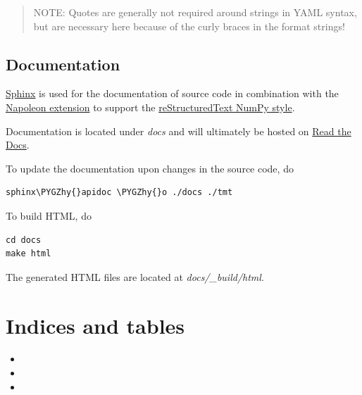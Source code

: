 \documentclass[letterpaper,10pt,english]{sphinxmanual}
\def\PYGZhy{\char`\-}
\begin{document}
\begin{quote}

NOTE: Quotes are generally not required around strings in YAML syntax, but are necessary here because of the curly braces in the format strings!
\end{quote}


\section{Documentation}
\label{intro:documentation}\label{intro:id3}
\href{http://sphinx-doc.org/index.html}{Sphinx} is used for the documentation of source code in combination with the \href{https://pypi.python.org/pypi/sphinxcontrib-napoleon}{Napoleon extension} to support the \href{https://github.com/numpy/numpy/blob/master/doc/HOWTO\_DOCUMENT.rst.txt\#docstring-standard}{reStructuredText NumPy style}.

Documentation is located under \emph{docs} and will ultimately be hosted on \href{https://readthedocs.org/}{Read the Docs}.

To update the documentation upon changes in the source code, do

\begin{Verbatim}[commandchars=\\\{\}]
sphinx\PYGZhy{}apidoc \PYGZhy{}o ./docs ./tmt
\end{Verbatim}

To build HTML, do

\begin{Verbatim}[commandchars=\\\{\}]
cd docs
make html
\end{Verbatim}

The generated HTML files are located at \emph{docs/\_build/html}.


\chapter{Indices and tables}
\label{index:indices-and-tables}\begin{itemize}
\item {} 

\item {} 

\item {} 

\end{itemize}



\renewcommand{\indexname}{Index}
\printindex
\end{document}
